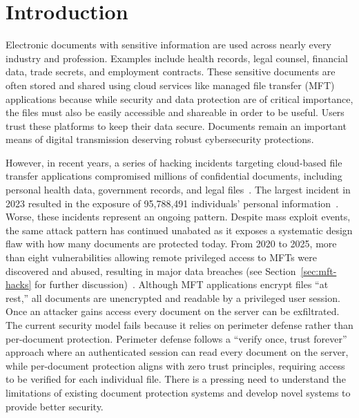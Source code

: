 \chapter{Introduction}
\label{ch:intro}

Electronic documents with sensitive information are used across nearly every industry and profession. Examples include health records, legal counsel, financial data, trade secrets, and employment contracts. These sensitive documents are often stored and shared using cloud services like managed file transfer (MFT) applications because while security and data protection are of critical importance, the files must also be easily accessible and shareable in order to be useful. Users trust these platforms to keep their data secure. Documents remain an important means of digital transmission deserving robust cybersecurity protections.

However, in recent years, a series of hacking incidents targeting cloud-based file transfer applications compromised millions of confidential documents, including personal health data, government records, and legal files~\cite{kondruss_moveit_2023,cisa_cl0p_2023}. The largest incident in 2023 resulted in the exposure of 95{,}788{,}491 individuals' personal information~\cite{simas_unpacking_2023}. Worse, these incidents represent an ongoing pattern. Despite mass exploit events, the same attack pattern has continued unabated as it exposes a systematic design flaw with how many documents are protected today. From 2020 to 2025, more than eight vulnerabilities allowing remote privileged access to MFTs were discovered and abused, resulting in major data breaches (see Section~\ref{sec:mft-hacks} for further discussion)~\cite{cisa_cl0p_2023}. Although MFT applications encrypt files ``at rest,'' all documents are unencrypted and readable by a privileged user session. Once an attacker gains access every document on the server can be exfiltrated. The current security model fails because it relies on perimeter defense rather than per-document protection. Perimeter defense follows a ``verify once, trust forever'' approach where an authenticated session can read every document on the server, while per-document protection aligns with zero trust principles, requiring access to be verified for each individual file. There is a pressing need to understand the limitations of existing document protection systems and develop novel systems to provide better security.

